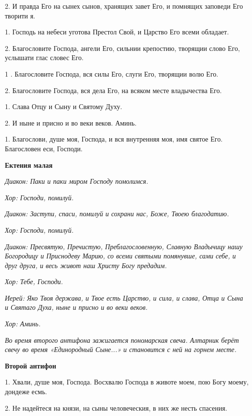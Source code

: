 2. И правда Его на сынех сынов, хранящих завет Его, и помнящих заповеди Его творити я. 


1. Господь на небеси уготова Престол Свой, и Царство Его всеми обладает. 


2. Благословите Господа, ангели Его,  сильнии крепостию, творящии слово Его, услышати глас словес Его. 


1 . Благословите Господа, вся силы Его, слуги Его, творящии волю Его. 


2. Благословите Господа, вся дела Его, на всяком месте владычества Его. 


1. Слава Отцу и Сыну и Святому Духу. 


2. И ныне и присно и во веки веков. Аминь. 


1. Благослови, душе моя, Господа, и вся внутренняя моя, имя святое Его. Благословен еси, Господи.


\medskip\bfseries Ектения малая \normalfont{}\nopagebreak


\medskip\itshape Диакон:\normalfont{} Паки и паки миром Господу помолимся. 


\itshape Хор:\normalfont{} Господи, помилуй. 


\itshape Диакон:\normalfont{} Заступи, спаси, помилуй и сохрани нас, Боже, Твоею благодатию. 


\itshape Хор:\normalfont{} Господи, помилуй. 


\itshape Диакон:\normalfont{} Пресвятую, Пречистую, Преблагословенную, Славную Владычицу нашу Богородицу и Приснодеву Марию, со всеми святыми помянувше, сами себе, и друг друга, и весь живот наш Христу Богу предадим. 


\itshape Хор:\normalfont{} Тебе, Господи. 


\itshape Иерей:\normalfont{} Яко Твоя держава, и Твое есть Царство, и сила, и слава, Отца и Сына и Святаго Духа, ныне и присно и во веки веков. 


\itshape Хор:\normalfont{} Аминь. 


\itshape Во время второго антифона зажигается пономарская свеча. Алтарник берёт свечу во время «Единородный Сыне...» и становится с ней на горнем месте.\normalfont{}


\medskip\bfseries Второй антифон \normalfont{}\nopagebreak


1. Хвали, душе моя, Господа. Восхвалю Господа в животе моем, пою Богу моему, дондеже есмь. 


2. Не надейтеся на князи, на сыны человеческия, в них же несть спасения. 


